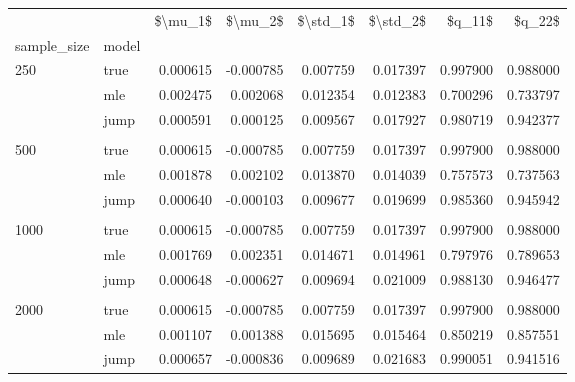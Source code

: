 \begin{tabular}{llrrrrrr}
\toprule
     &      &   \$\textbackslash mu\_1\$ &   \$\textbackslash mu\_2\$ &  \$\textbackslash std\_1\$ &  \$\textbackslash std\_2\$ &    \$q\_11\$ &    \$q\_22\$ \\
sample\_size & model &           &           &           &           &           &           \\
\midrule
250  & true &  0.000615 & -0.000785 &  0.007759 &  0.017397 &  0.997900 &  0.988000 \\
     & mle &  0.002475 &  0.002068 &  0.012354 &  0.012383 &  0.700296 &  0.733797 \\
     & jump &  0.000591 &  0.000125 &  0.009567 &  0.017927 &  0.980719 &  0.942377 \\
     \\
500  & true &  0.000615 & -0.000785 &  0.007759 &  0.017397 &  0.997900 &  0.988000 \\
     & mle &  0.001878 &  0.002102 &  0.013870 &  0.014039 &  0.757573 &  0.737563 \\
     & jump &  0.000640 & -0.000103 &  0.009677 &  0.019699 &  0.985360 &  0.945942 \\
     \\
1000 & true &  0.000615 & -0.000785 &  0.007759 &  0.017397 &  0.997900 &  0.988000 \\
     & mle &  0.001769 &  0.002351 &  0.014671 &  0.014961 &  0.797976 &  0.789653 \\
     & jump &  0.000648 & -0.000627 &  0.009694 &  0.021009 &  0.988130 &  0.946477 \\
     \\
2000 & true &  0.000615 & -0.000785 &  0.007759 &  0.017397 &  0.997900 &  0.988000 \\
     & mle &  0.001107 &  0.001388 &  0.015695 &  0.015464 &  0.850219 &  0.857551 \\
     & jump &  0.000657 & -0.000836 &  0.009689 &  0.021683 &  0.990051 &  0.941516 \\
\bottomrule
\end{tabular}
